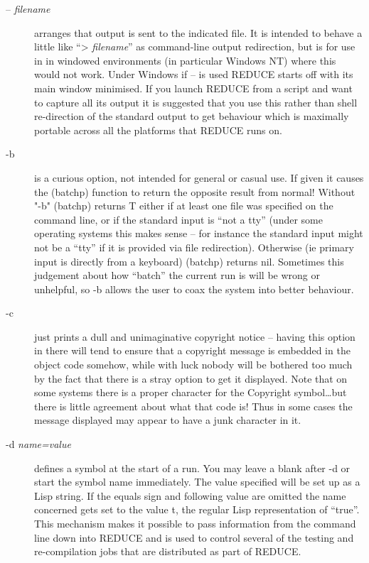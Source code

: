 \documentclass[a4paper,11pt]{article}
\begin{document}
\begin{description}
\item[{\ttfamily -- \rmfamily \slshape filename}]
arranges that output is sent to the indicated file. It is
intended to behave a little like ``{\ttfamily > \rmfamily \slshape filename}''
as command-line output
redirection, but is for use in in windowed environments (in particular
Windows NT) where this would not work.  Under Windows if {\ttfamily --} is
used REDUCE starts off with its main window minimised.  If you launch
REDUCE from a script and want to capture all its output it is suggested
that you use this rather than shell re-direction of the standard output
to get behaviour which is maximally portable across all the platforms that
REDUCE runs on.

\item[{\ttfamily -b}]
is a curious option, not intended for general or casual use. If given
it causes the (batchp) function to return the opposite result from
normal!  Without "-b" (batchp) returns T either if at least one file
was specified on the command line, or if the standard input is ``not
a tty'' (under some operating systems this makes sense -- for instance
the standard input might not be a ``tty'' if it is provided via file
redirection).  Otherwise (ie primary input is directly from a keyboard)
(batchp) returns nil.  Sometimes this judgement about how ``batch'' the
current run is will be wrong or unhelpful, so {\ttfamily -b} allows the
user to coax the system into better behaviour.

\item[{\ttfamily -c}]
just prints a dull and unimaginative copyright notice --
having this option in there will tend to ensure that a copyright
message is embedded in the object code somehow, while with luck nobody
will be bothered too much by the fact that there is a stray option to get
it displayed.  Note that on some systems there is a proper character
for the Copyright symbol\ldots but there is little agreement about what
that code is! Thus in some cases the message displayed may appear to have
a junk character in it.

\item[{\ttfamily -d \rmfamily \slshape name=value}]
defines a symbol at the start of a run.
You may leave a blank after {\ttfamily -d} or start the symbol name
immediately. The value specified will be set up as a Lisp string. If the
equals sign and following value are omitted the name concerned gets set to
the value {\ttfamily t}, the regular Lisp representation of ``true''. This
mechanism makes it possible to pass information from the command line down
into REDUCE and is used to control several of the testing and re-compilation
jobs that are distributed as part of REDUCE.


\end{description}
\end{document}
